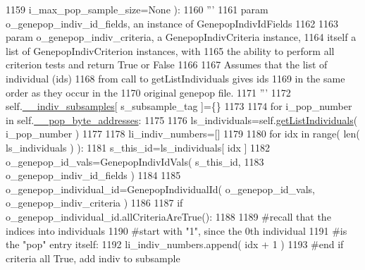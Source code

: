 \begin{DoxyCode}
1159                                             i\_max\_pop\_sample\_size=\textcolor{keywordtype}{None} ):
1160         \textcolor{stringliteral}{'''}
1161 \textcolor{stringliteral}{        param o\_genepop\_indiv\_id\_fields, an instance of GenepopIndivIdFields}
1162 \textcolor{stringliteral}{}
1163 \textcolor{stringliteral}{        param o\_genepop\_indiv\_criteria, a GenepopIndivCriteria instance,}
1164 \textcolor{stringliteral}{            itself a list of GenepopIndivCriterion instances, with}
1165 \textcolor{stringliteral}{            the ability to perform all criterion tests and return True or False}
1166 \textcolor{stringliteral}{}
1167 \textcolor{stringliteral}{        Assumes that the list of individual (ids)}
1168 \textcolor{stringliteral}{        from call to getListIndividuals gives ids}
1169 \textcolor{stringliteral}{        in the same order as they occur in the }
1170 \textcolor{stringliteral}{        original genepop file.}
1171 \textcolor{stringliteral}{        '''}
1172         self.\hyperlink{classnegui_1_1genepopfilemanager_1_1GenepopFileManager_a1e8379bcee4902ca9314ff53fcb71644}{\_\_indiv\_subsamples}[ s\_subsample\_tag ]=\{\}
1173 
1174         \textcolor{keywordflow}{for} i\_pop\_number \textcolor{keywordflow}{in} self.\hyperlink{classnegui_1_1genepopfilemanager_1_1GenepopFileManager_ae24c2bdd19136a345bdb42fd49c5d91f}{\_\_pop\_byte\_addresses}:
1175 
1176             ls\_individuals=self.\hyperlink{classnegui_1_1genepopfilemanager_1_1GenepopFileManager_aa6993dde24163002aeae55005437711d}{getListIndividuals}( i\_pop\_number )
1177 
1178             li\_indiv\_numbers=[]
1179 
1180             \textcolor{keywordflow}{for} idx \textcolor{keywordflow}{in} range( len( ls\_individuals ) ):
1181                 s\_this\_id=ls\_individuals[ idx ]
1182                 o\_genepop\_id\_vals=GenepopIndivIdVals( s\_this\_id, 
1183                                             o\_genepop\_indiv\_id\_fields )
1184 
1185                 o\_genepop\_individual\_id=GenepopIndividualId( o\_genepop\_id\_vals, o\_genepop\_indiv\_criteria )
1186                 
1187                 \textcolor{keywordflow}{if} o\_genepop\_individual\_id.allCriteriaAreTrue():
1188 
1189                     \textcolor{comment}{#recall that the indices into individuals }
1190                     \textcolor{comment}{#start with "1", since the 0th individual}
1191                     \textcolor{comment}{#is the "pop" entry itself:}
1192                     li\_indiv\_numbers.append( idx + 1 )
1193                 \textcolor{comment}{#end if criteria all True, add indiv to subsample}

\end{DoxyCode}
